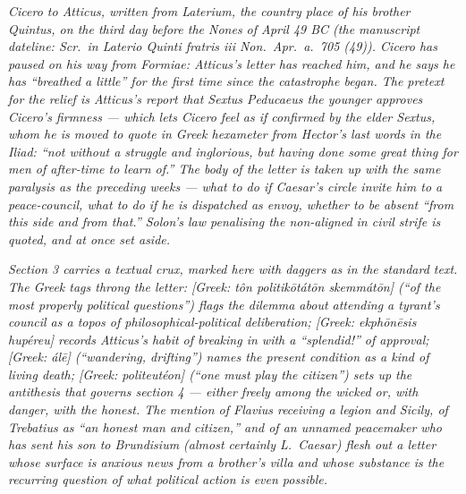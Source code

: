 
\textit{Cicero to Atticus, written from Laterium, the
country place of his brother Quintus, on the third day
before the Nones of April 49 BC (the manuscript dateline:
\textit{Scr.\ in Laterio Quinti fratris iii Non.\ Apr.\ a.\
705 (49)}). Cicero has paused on his way from Formiae:
Atticus's letter has reached him, and he says he has
``breathed a little'' for the first time since the
catastrophe began. The pretext for the relief is Atticus's
report that Sextus Peducaeus the younger approves Cicero's
firmness --- which lets Cicero feel as if confirmed by the
elder Sextus, whom he is moved to quote in Greek hexameter
from Hector's last words in the \textit{Iliad}: ``not
without a struggle and inglorious, but having done some
great thing for men of after-time to learn of.'' The body of
the letter is taken up with the same paralysis as the
preceding weeks --- what to do if Caesar's circle invite him
to a peace-council, what to do if he is dispatched as envoy,
whether to be absent ``from this side and from that.''
Solon's law penalising the non-aligned in civil strife is
quoted, and at once set aside.}

\textit{Section 3 carries a textual crux, marked here with
daggers as in the standard text. The Greek tags throng the
letter: \textit{[Greek: t\^on politik\=ot\'at\=on
skemm\'at\=on]} (``of the most properly political
questions'') flags the dilemma about attending a tyrant's
council as a topos of philosophical-political
deliberation; \textit{[Greek: ekph\=on\=esis hup\'ereu]}
records Atticus's habit of breaking in with a ``splendid!''
of approval; \textit{[Greek: \'al\=e]} (``wandering,
drifting'') names the present condition as a kind of
living death; \textit{[Greek: politeut\'eon]} (``one
must play the citizen'') sets up the antithesis that
governs section 4 --- either freely among the wicked or,
with danger, with the honest. The mention of Flavius
receiving a legion and Sicily, of Trebatius as ``an honest
man and citizen,'' and of an unnamed peacemaker who has
sent his son to Brundisium (almost certainly L.\ Caesar)
flesh out a letter whose surface is anxious news from a
brother's villa and whose substance is the recurring
question of what political action is even possible.}
